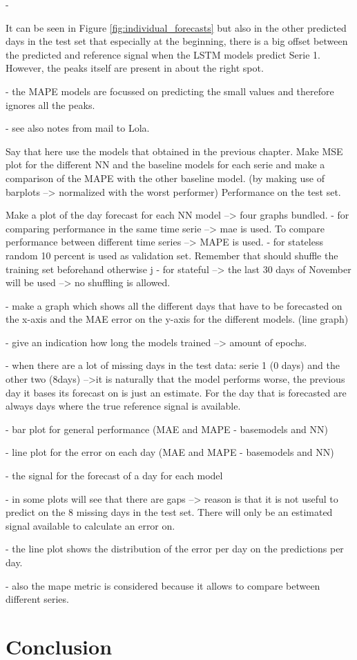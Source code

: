 - 

It can be seen in Figure \ref{fig:individual_forecasts} but also in the other predicted days in the test set that especially at the beginning, there is a big offset between the predicted and reference signal when the LSTM models predict Serie 1. However, the peaks itself are present in about the right spot.

- the MAPE models are focussed on predicting the small values and therefore ignores all the peaks.





- see also notes from mail to Lola. 

Say that here use the models that obtained in the previous chapter. Make MSE plot for the different NN and the baseline models for each serie and make a comparison of the MAPE with the other baseline model. (by making use of barplots --> normalized with the worst performer) Performance on the test set. 

Make a plot of the day forecast for each NN model --> four graphs bundled. 
- for comparing performance in the same time serie --> mae is used. To compare performance between different time series --> MAPE is used. 
- for stateless random 10 percent is used as validation set. Remember that should shuffle the training set beforehand otherwise j
- for stateful --> the last 30 days of November will be used --> no shuffling is allowed.

- make a graph which shows all the different days that have to be forecasted on the x-axis and the MAE error on the y-axis for the different models. (line graph)

- give an indication how long the models trained --> amount of epochs. 

- when there are a lot of missing days in the test data: serie 1 (0 days) and the other two (8days) -->it is naturally that the model performs worse, the previous day it bases its forecast on is just an estimate. For the day that is forecasted are always days where the true reference signal is available. 



- bar plot for general performance (MAE and MAPE - basemodels and NN)

- line plot for the error on each day (MAE and MAPE - basemodels and NN)

- the signal for the forecast of a day for each model

- in some plots will see that there are gaps --> reason is that it is not useful to predict on the $ 8 $ missing days in the test set. There will only be an estimated signal available to calculate an error on. 

- the line plot shows the distribution of the error per day on the predictions per day. 

- also the mape metric is considered because it allows to compare between different series. 


\section{Conclusion}


